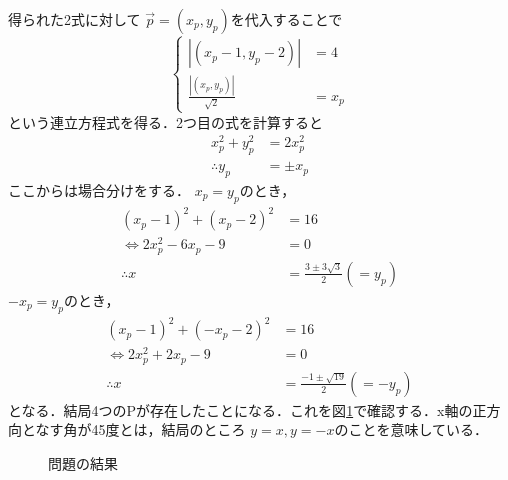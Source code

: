 \documentclass[dvipdfmx]{jsarticle}
\begin{document}
    得られた2式に対して \(\vec{p}=(x_p,y_p)\)を代入することで
    \[
    \begin{cases}
        |(x_p-1,y_p-2)|&=4\\
        \displaystyle\frac{|(x_p,y_p)|}{\sqrt{2}}&=x_p
    \end{cases}
    \]
    という連立方程式を得る．2つ目の式を計算すると
    \begin{align*}
        x_p^2+y_p^2&=2x_p^2\\
        \therefore y_p&=\pm x_p
    \end{align*}
    ここからは場合分けをする． \(x_p=y_p\)のとき，
    \begin{align*}
        (x_p-1)^2+(x_p-2)^2&= 16\\
        \Leftrightarrow 2x_p^2 -6 x_p-9&=0\\
        \therefore x&= \frac{3\pm3\sqrt{3}}{2}(=y_p)
    \end{align*}
    \(-x_p=y_p\)のとき，
    \begin{align*}
        (x_p-1)^2+(-x_p-2)^2&= 16\\
        \Leftrightarrow 2x_p^2 +2 x_p-9&=0\\
        \therefore x&= \frac{-1\pm\sqrt{19}}{2}(=-y_p)
    \end{align*}
    となる．結局4つのPが存在したことになる．これを図\ref{tikz_vector_equation_example_question}で確認する．x軸の正方向となす角が45度とは，結局のところ \(y=x,y=-x\)のことを意味している．

    \begin{figure}[htbp]\centering
        \caption{問題の結果}
        \label{tikz_vector_equation_example_question}
    \end{figure}
\end{document}
